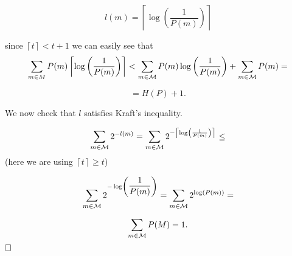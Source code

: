 \[
l(m) = \left\lceil\log\left(\dfrac{1}{P(m)}\right)\right\rceil
\]

since $\left\lceil t \right\rceil < t + 1$ we can easily see that 
\[
\sum_{m \in M} P(m)\left\lceil\log\left(\dfrac{1}{P(m)}\right)\right\rceil < \sum_{m \in \mathcal{M}} P(m)\log\left(\dfrac{1}{P(m)}\right) + \sum_{m \in \mathcal{M}} P(m) = 
\]

\[
 = H(P) + 1.
\]

We now check that $l$ satisfies Kraft's inequality.

\[
\sum_{m \in \mathcal{M}} 2^{-l(m)} = \sum_{m \in \mathcal{M}} 2^{-\left\lceil\log\left(\frac{1}{P(m)}\right)\right\rceil} \leq
\]
(here we are using $\left\lceil t \right\rceil \geq t$)

\[
 \sum_{m \in \mathcal{M}} 2^{-\log\left(\dfrac{1}{P(m)}\right)} = \sum_{m \in \mathcal{M}} 2^{\log(P(m))} =
\]

\[
 \sum_{m \in \mathcal{M}} P(M) = 1.
\]
$\hfill\Box$